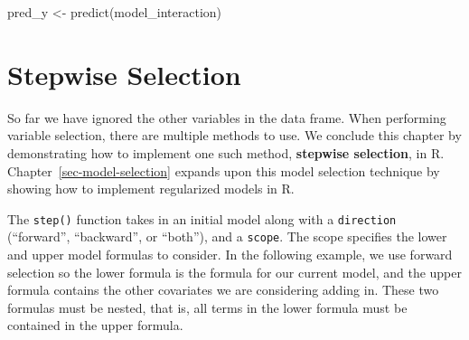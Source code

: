 \documentclass[
  letterpaper,
]{latex/krantz}
\makeatletter
\newenvironment{Shaded}{\begin{snugshade}}{\end{snugshade}}
\newcommand{\CommentTok}[1]{\textcolor[rgb]{0.37,0.37,0.37}{#1}}
\newcommand{\DecValTok}[1]{\textcolor[rgb]{0.68,0.00,0.00}{#1}}
\newcommand{\FunctionTok}[1]{\textcolor[rgb]{0.28,0.35,0.67}{#1}}
\newcommand{\NormalTok}[1]{\textcolor[rgb]{0.00,0.23,0.31}{#1}}
\newcommand{\OtherTok}[1]{\textcolor[rgb]{0.00,0.23,0.31}{#1}}
\newcommand{\SpecialCharTok}[1]{\textcolor[rgb]{0.37,0.37,0.37}{#1}}
\newenvironment{kframe}{%
\medskip{}
\setlength{\fboxsep}{.8em}
 \def\at@end@of@kframe{}%
 \ifinner\ifhmode%
  \def\at@end@of@kframe{\end{minipage}}%
  \begin{minipage}{\columnwidth}%
 \fi\fi%
 \def\FrameCommand##1{\hskip\@totalleftmargin \hskip-\fboxsep
 \colorbox{shadecolor}{##1}\hskip-\fboxsep
     \hskip-\linewidth \hskip-\@totalleftmargin \hskip\columnwidth}%
 \MakeFramed {\advance\hsize-\width
   \@totalleftmargin\z@ \linewidth\hsize
   \@setminipage}}%
 {\par\unskip\endMakeFramed%
 \at@end@of@kframe}
\renewenvironment{Shaded}{\begin{kframe}}{\end{kframe}}
\makeatother
\begin{document}
\begin{Shaded}
\begin{Highlighting}[]
\NormalTok{pred\_y }\OtherTok{\textless{}{-}} \FunctionTok{predict}\NormalTok{(model\_interaction)}
\end{Highlighting}
\end{Shaded}

\begin{Shaded}
\end{Shaded}

\begin{Shaded}
\end{Shaded}

\section{\texorpdfstring{Stepwise Selection
}{Stepwise Selection }}\label{stepwise-selection}

So far we have ignored the other variables in the data frame. When
performing variable selection, there are multiple methods to use. We
conclude this chapter by demonstrating how to implement one such method,
\textbf{stepwise selection}, in R. Chapter~\ref{sec-model-selection}
expands upon this model selection technique by showing how to implement
regularized models in R.

The \texttt{step()} function
takes in an initial model along with a \texttt{direction} (``forward'',
``backward'', or ``both''), and a \texttt{scope}. The scope specifies
the lower and upper model formulas to consider. In the following
example, we use forward selection so the lower formula is the formula
for our current model, and the upper formula contains the other
covariates we are considering adding in. These two formulas must be
nested, that is, all terms in the lower formula must be contained in the
upper formula.
\end{document}
